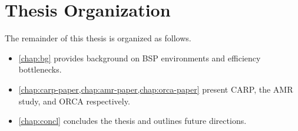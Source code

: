 \section{Thesis Organization}
\label{sec:intro:org}

The remainder of this thesis is organized as follows.
\begin{itemize}
  \item \cref{chap:bg} provides background on BSP environments and efficiency bottlenecks.
  \item \cref{chap:carp-paper,chap:amr-paper,chap:orca-paper} present CARP, the AMR study, and ORCA
        respectively.
  \item \cref{chap:concl} concludes the thesis and outlines future directions.
\end{itemize}














